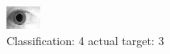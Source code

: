 \begin{figure}[h!]
\begin{center}
\includegraphics[width=0.60\columnwidth]{figures/ID1906_class_4_target_3.png}
\end{center}
\caption{ Classification: 4 actual target: 3}
\label{fig:ID1906_class_4_target_3}
\end{figure}
